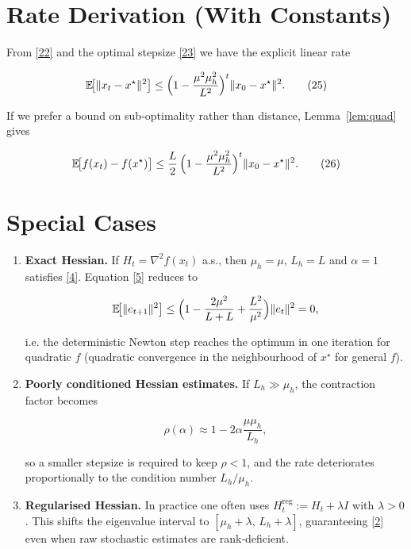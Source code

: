 \documentclass{article}
\newcommand{\E}{\mathbb{E}}
\begin{document}
\section*{Rate Derivation (With Constants)}
From \eqref{22} and the optimal stepsize \eqref{23} we have the explicit linear rate  

\[
\E\!\big[\|x_{t}-x^{\star}\|^{2}\big]
\le
\Bigl(1-\frac{\mu^{2}\mu_h^{2}}{L^{2}}\Bigr)^{t}
\|x_{0}-x^{\star}\|^{2}.
\tag{25}
\]

If we prefer a bound on sub‑optimality rather than distance, Lemma~\ref{lem:quad} gives  

\[
\E\!\big[f(x_{t})-f(x^{\star})\big]
\le
\frac{L}{2}\,
\Bigl(1-\frac{\mu^{2}\mu_h^{2}}{L^{2}}\Bigr)^{t}
\|x_{0}-x^{\star}\|^{2}.
\tag{26}
\]

\section*{Special Cases}
\begin{enumerate}
\item \textbf{Exact Hessian.}  If $H_t=\nabla^{2}f(x_t)$ a.s., then $\mu_h=\mu$, $L_h=L$ and $\alpha=1$ satisfies \eqref{4}.  Equation \eqref{5} reduces to  

\[
\E\!\big[\|e_{t+1}\|^{2}\big]
\le\Bigl(1-\frac{2\mu^{2}}{L+L}+ \frac{L^{2}}{\mu^{2}}\Bigr)\|e_t\|^{2}
=0,
\]

i.e. the deterministic Newton step reaches the optimum in one iteration for quadratic $f$ (quadratic convergence in the neighbourhood of $x^{\star}$ for general $f$).

\item \textbf{Poorly conditioned Hessian estimates.}  If $L_h\gg\mu_h$, the contraction factor becomes  

\[
\rho(\alpha)\approx 1-2\alpha\frac{\mu\mu_h}{L_h},
\]

so a smaller stepsize is required to keep $\rho<1$, and the rate deteriorates proportionally to the condition number $L_h/\mu_h$.

\item \textbf{Regularised Hessian.}  In practice one often uses $H_t^{\text{reg}}:=H_t+\lambda I$ with $\lambda>0$.  This shifts the eigenvalue interval to $[\mu_h+\lambda,\,L_h+\lambda]$, guaranteeing \eqref{2} even when raw stochastic estimates are rank‑deficient.
\end{enumerate}
\end{document}
